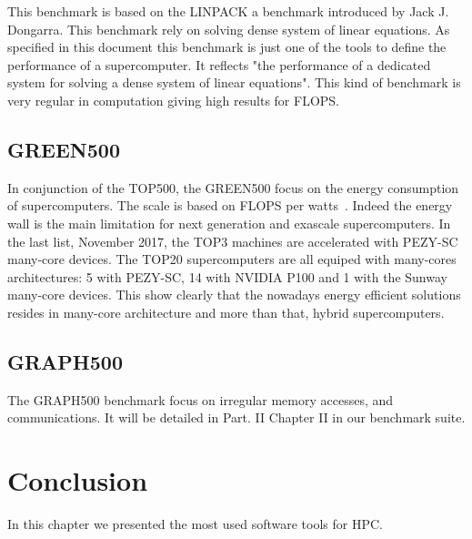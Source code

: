 This benchmark is based on the LINPACK\cite{dongarra1994top500} a benchmark introduced by Jack J. Dongarra.
This benchmark rely on solving  dense system of linear equations. 
As specified in this document this benchmark is just one of the tools to define the performance of a supercomputer. 
It reflects "the performance of a dedicated system for solving a dense system of linear equations".
This kind of benchmark is very regular in computation giving high results for FLOPS. 

\subsection{GREEN500}
In conjunction of the TOP500, the GREEN500 focus on the energy consumption of supercomputers. 
The scale is based on FLOPS per watts~\cite{feng2007green500}.
Indeed the energy wall is the main limitation for next generation and exascale supercomputers. 
In the last list, November 2017, the TOP3 machines are accelerated with PEZY-SC many-core devices. 
The TOP20 supercomputers are all equiped with many-cores architectures: 5 with PEZY-SC, 14 with NVIDIA P100 and 1 with the Sunway many-core devices. 
This show clearly that the nowadays energy efficient solutions resides in many-core architecture and more than that, hybrid supercomputers. 

\subsection{GRAPH500}
The GRAPH500 benchmark focus on irregular memory accesses, and communications.
It will be detailed in Part. II Chapter II in our benchmark suite. 

\section{Conclusion}
In this chapter we presented the most used software tools for HPC. 

